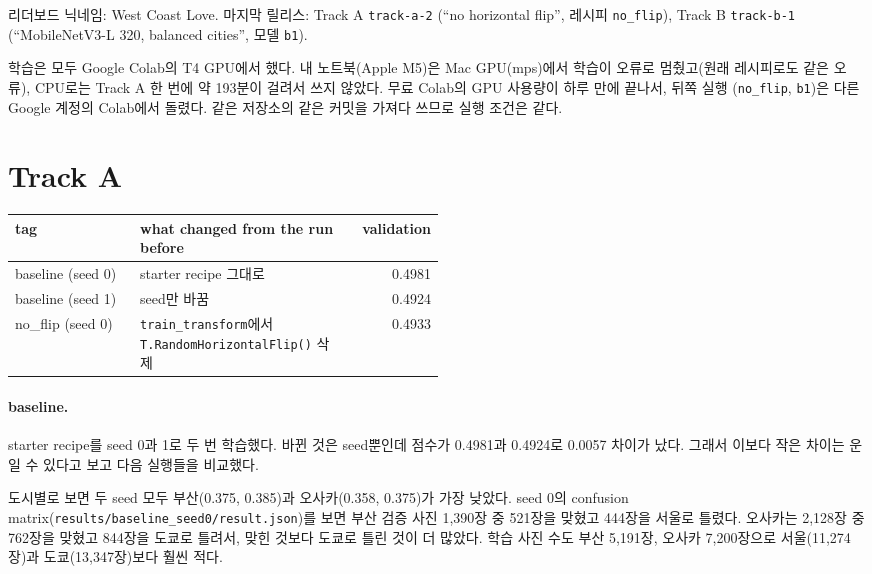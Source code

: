 \documentclass[11pt]{article}
\begin{document}
\makeheader

리더보드 닉네임: West Coast Love.
마지막 릴리스: Track A \texttt{track-a-2} (``no horizontal flip'', 레시피 \texttt{no\_flip}),
Track B \texttt{track-b-1} (``MobileNetV3-L 320, balanced cities'', 모델 \texttt{b1}).

학습은 모두 Google Colab의 T4 GPU에서 했다. 내 노트북(Apple M5)은 Mac GPU(mps)에서
학습이 오류로 멈췄고(원래 레시피로도 같은 오류), CPU로는 Track A 한 번에 약 193분이
걸려서 쓰지 않았다. 무료 Colab의 GPU 사용량이 하루 만에 끝나서, 뒤쪽 실행
(\texttt{no\_flip}, \texttt{b1})은 다른 Google 계정의 Colab에서 돌렸다. 같은 저장소의 같은 커밋을
가져다 쓰므로 실행 조건은 같다.

\section*{Track A}

\begin{center}\footnotesize
\begin{tabular}{lp{0.5\linewidth}r}
\toprule
tag & what changed from the run before & validation \\
\midrule
baseline (seed 0) & starter recipe 그대로 & 0.4981 \\
baseline (seed 1) & seed만 바꿈 & 0.4924 \\
no\_flip (seed 0) & \texttt{train\_transform}에서 \texttt{T.RandomHorizontalFlip()} 삭제 & 0.4933 \\
\bottomrule
\end{tabular}
\end{center}

\paragraph{baseline.} starter recipe를 seed 0과 1로 두 번 학습했다. 바뀐 것은 seed뿐인데
점수가 0.4981과 0.4924로 0.0057 차이가 났다. 그래서 이보다 작은 차이는 운일 수 있다고 보고
다음 실행들을 비교했다.

도시별로 보면 두 seed 모두 부산(0.375, 0.385)과 오사카(0.358, 0.375)가 가장 낮았다.
seed 0의 confusion matrix(\texttt{results/baseline\_seed0/result.json})를 보면 부산 검증 사진
1,390장 중 521장을 맞혔고 444장을 서울로 틀렸다. 오사카는 2,128장 중 762장을 맞혔고
844장을 도쿄로 틀려서, 맞힌 것보다 도쿄로 틀린 것이 더 많았다. 학습 사진 수도
부산 5,191장, 오사카 7,200장으로 서울(11,274장)과 도쿄(13,347장)보다 훨씬 적다.
\end{document}
